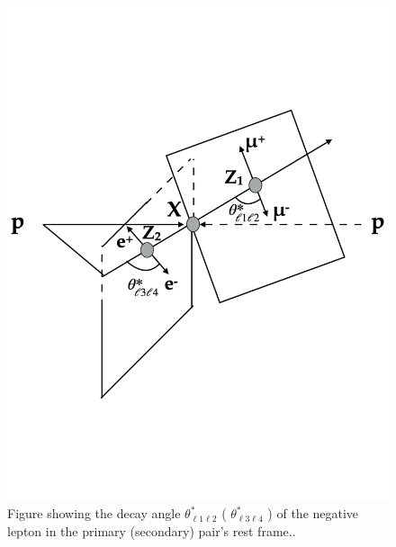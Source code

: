 \begin{figure}
\centering
\includegraphics[width=.8\linewidth]{figures/AnalysisOverview/costhetaFrameOfRef.pdf}
\caption{Figure showing the decay angle $\theta^{*}_{\ell 1 \ell 2}$ ( $\theta^{*}_{\ell 3 \ell 4}$ ) of the negative lepton in the primary (secondary) pair's rest frame.\label{fig:costhetaFrameOfRef}\cite{AngularFrameDef}.}
\end{figure}